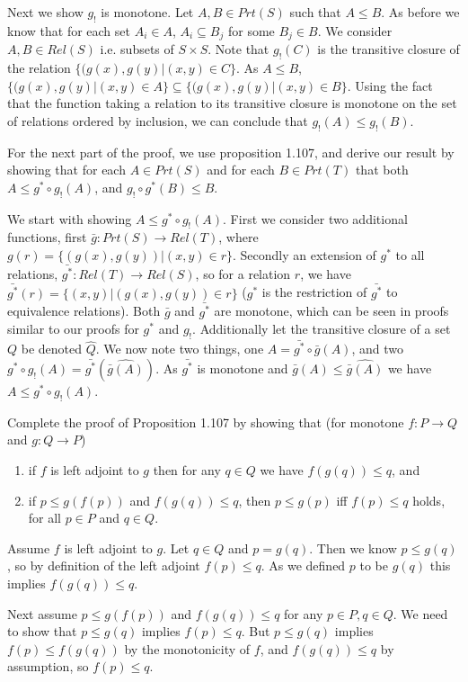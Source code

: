 Next we show $g_!$ is monotone.  Let $A, B\in Prt(S)$ such that $A\leq B$.  As before we know that for each set $A_i\in A$, $A_i\subseteq B_j$ for some $B_j\in B$. We consider $A,B\in Rel(S)$ i.e. subsets of $S\times S$. Note that $g_{!}(C)$  is the transitive closure of the relation $\{ (g(x),g(y)| (x, y)\in C\}$.  As $A\leq B$, $\{ (g(x),g(y)| (x, y)\in A\}\subseteq \{ (g(x),g(y)| (x, y)\in B\}$.  Using the fact that the function taking a relation to its transitive closure is monotone on the set of relations ordered by inclusion, we can conclude that $g_{!}(A)\leq g_{!}(B)$.

For the next part of the proof, we use proposition 1.107, and  derive our result by showing that for each $A\in Prt(S)$ and for each $B\in Prt(T)$ that both $A\leq g^*\circ g_!(A)$, and $g_!\circ g^*(B)\leq B$. 

 We start with showing $A\leq g^*\circ g_!(A)$. First we consider two additional functions, first $\bar{g}: Prt(S) \to Rel(T)$, where $g(r) = \{(g(x),g(y))| (x,y)\in r\}$.  Secondly an extension of $g^*$ to all relations, $\bar{g^*}:Rel(T)\to Rel(S)$, so for a relation $r$, we have $\bar{g^*}(r) = \{(x,y)| (g(x),g(y))\in r\}$ ($g^*$ is the restriction of $\bar{g^*}$ to equivalence relations).  Both $\bar{g}$ and $\bar{g^*}$ are monotone, which can be seen in proofs similar to our proofs for $g^*$ and $g_!$.  Additionally let the transitive closure of a set $Q$ be denoted $\hat{Q}$. We now note two things, one $A = \bar{g^*}\circ \bar{g}(A)$, and two $ g^*\circ g_!(A) = \bar{g^*}( \widehat{\bar{g}(A)})$.  As $\bar{g^*}$ is monotone and $\bar{g}(A)\leq \widehat{\bar{g}(A)}$ we have $A\leq g^*\circ g_!(A)$.
 

Complete the proof of Proposition 1.107 by showing that (for monotone $f:P\to Q$ and $g:Q\to P$)
\begin{enumerate}
	\item if $f$ is left adjoint to $g$ then for any $q\in Q$ we have $f(g(q))\leq q$, and
	\item if $p\leq g(f(p))$ and $f(g(q))\leq q$, then $p\leq g(p)$ iff $f(p)\leq q$ holds, for all $p\in P$ and $q\in Q$.
\end{enumerate}

\solution
Assume $f$ is left adjoint to $g$.  Let $q\in Q$ and $p=g(q)$. Then we know $p\leq g(q)$, so by definition of the left adjoint $f(p)\leq q$.  As we defined $p$ to be $g(q)$ this implies $f(g(q))\leq q$.

Next assume $p\leq g(f(p))$ and $f(g(q))\leq q$ for any $p\in P, q\in Q$.  We need to show that $p\leq g(q)$ implies $f(p)\leq q$.  But $p\leq g(q)$ implies $f(p)\leq f(g(q))$ by the monotonicity of $f$, and $f(g(q))\leq q$ by assumption, so $f(p)\leq q$.

